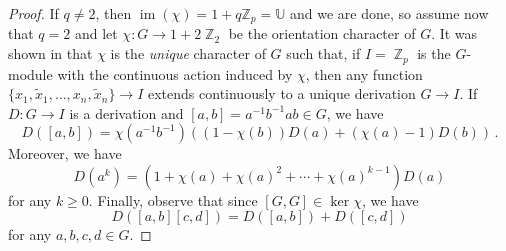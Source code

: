 \documentclass[a4paper]{amsart}
\DeclareMathOperator{\bbz}{\mathbb{Z}}
\theoremstyle{definition}
\begin{document}
\begin{proof}
If \(q \neq 2\), then \(\operatorname{im}(\chi) = 1 + q\mathbb{Z}_p = \mathbb{U}\) and we are done, so assume now that \(q = 2\) and let \(\chi\colon G \to 1+2\bbz_2\) be the orientation character of \(G\). It was shown in \cite[Thm. 4]{labuteClassificationDemushkinGroups1967} that \(\chi\) is the \emph{unique} character of \(G\) such that, if \(I = \bbz_p\) is the \(G\)-module with the continuous action induced by \(\chi\), then any function \(\{x_1,\widetilde{x}_1,\ldots,x_{n},\widetilde{x}_{n}\} \to I\) extends continuously to a unique derivation \(G \to I\). If \(D\colon G \to I\) is a derivation and \([a,b] = a^{-1}b^{-1}ab \in G\), we have \[D([a,b]) = \chi(a^{-1}b^{-1})((1-\chi(b))D(a) +(\chi(a)-1)D(b))\,.\] Moreover, we have \[D(a^k) = (1+\chi(a)+\chi(a)^2 + \cdots + \chi(a)^{k-1})D(a)\] for any \(k \geq 0\). Finally, observe that since \([G,G] \in \ker \chi\), we have \[D([a,b][c,d]) = D([a,b]) + D([c,d])\] for any \(a,b,c,d \in G\).


\end{proof}
\end{document}
